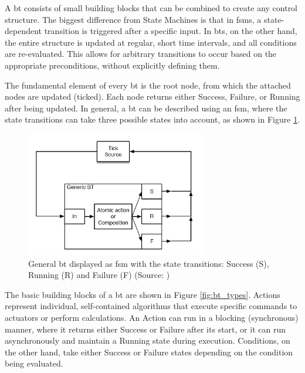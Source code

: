 A \gls{bt} consists of small building blocks that can be combined to create any control structure. The biggest difference from State Machines is that in \glspl{fsm}, a state-dependent transition is triggered after a specific input. In \glspl{bt}, on the other hand, the entire structure is updated at regular, short time intervals, and all conditions are re-evaluated. This allows for arbitrary transitions to occur based on the appropriate preconditions, without explicitly defining them.

The fundamental element of every \gls{bt} is the root node, from which the attached nodes are updated (ticked). Each node returns either Success, Failure, or Running after being updated. In general, a \gls{bt} can be described using an \gls{fsm}, where the state transitions can take three possible states into account, as shown in Figure \ref{fig:fsm_general_bt}.

\begin{figure}[h]
    \centering
    \includegraphics[width=0.7\textwidth]{figures/02_state_of_the_art/fsm_general_bt.png}
    \caption[General \gls{bt} displayed as \gls{fsm}]{General \gls{bt} displayed as \gls{fsm} with the state transitions: Success (S), Running (R) and Failure (F) (Source: \cite{colledanchise_behavior_2018})}
    \label{fig:fsm_general_bt}
\end{figure}

The basic building blocks of a \gls{bt} are shown in Figure \ref{fig:bt_types}. Actions represent individual, self-contained algorithms that execute specific commands to actuators or perform calculations. An Action can run in a blocking (synchronous) manner, where it returns either Success or Failure after its start, or it can run asynchronously and maintain a Running state during execution. Conditions, on the other hand, take either Success or Failure states depending on the condition being evaluated.

